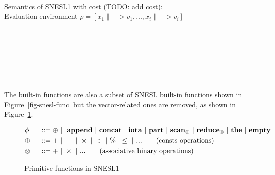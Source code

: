 
\\[3ex]



Semantics of SNESL1 with cost (TODO: add cost): \\
Evaluation environment $ \rho = [x_1 \|-> v_1,...,x_i \|-> v_i]$ \\

	\\[3ex]
	\PT{
		\Axiom{\Eval{\rho}{\{\}\tau}{\{\}}}
	}\\[3ex]

	\\[3ex]
	
	\\[3ex]
	
	\\[3ex]
	\\[3ex]
	\\[3ex]


The built-in functions are also a subset of SNESL built-in functions shown in Figure~\ref{fig-snesl-func} but  the vector-related ones are removed, as shown in Figure~\ref{fig-mysnesl-func}. 

\begin{figure}[h]
	\begin{alignat*}{2} 
	&\phi && ::= \oplus \ | \  \ \mathbf{append} \ | \ \mathbf{concat}  \ | \ \mathbf{iota}  \ | \ \mathbf{part}  \ | \ \mathbf{scan}_\otimes \ | \ \mathbf{reduce}_{\otimes} \ | \ \mathbf{the}  \ | \ \mathbf{empty} \\
	& \oplus  \ && :: = + \ | \ - \ | \ \times \ |  \  \div \ | \ \% \ | \le \ | \ ... \tag{consts operations} \\
	& \otimes \ && :: = + \ | \ \times  \ | \ ...  \tag{associative binary operations}
	\end{alignat*}
	\caption{Primitive functions in SNESL1 \label{fig-mysnesl-func}}
\end{figure}

